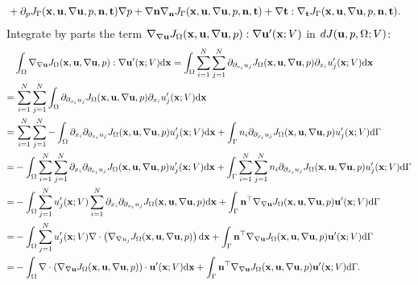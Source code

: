 \documentclass[oneside,11pt]{book}
\numberwithin{equation}{section}
\begin{document}
\begin{enumerate}[leftmargin=0in]
\begin{align*}
        &+ \partial_pJ_\Gamma({\bf x},{\bf u},\nabla{\bf u},p,{\bf n},{\bf t})\nabla p + \nabla{\bf n}\nabla_{\bf n}J_\Gamma({\bf x},{\bf u},\nabla{\bf u},p,{\bf n},{\bf t}) + \nabla{\bf t}:\nabla_{\bf t}J_\Gamma({\bf x},{\bf u},\nabla{\bf u},p,{\bf n},{\bf t}).
    \end{align*}
    Integrate by parts the term $\nabla_{\nabla{\bf u}}J_\Omega({\bf x},{\bf u},\nabla{\bf u},p):\nabla{\bf u}'({\bf x};V)$ in $dJ({\bf u},p,\Omega;V)$:
    \begin{align*}
        &\int_\Omega \nabla_{\nabla{\bf u}}J_\Omega({\bf x},{\bf u},\nabla{\bf u},p):\nabla{\bf u}'({\bf x};V){\rm d}{\bf x} = \int_\Omega \sum_{i=1}^N\sum_{j=1}^N \partial_{\partial_{x_i}u_j}J_\Omega({\bf x},{\bf u},\nabla{\bf u},p)\partial_{x_i}u_j'({\bf x};V){\rm d}{\bf x}\\
        =&\, \sum_{i=1}^N\sum_{j=1}^N \int_\Omega \partial_{\partial_{x_i}u_j}J_\Omega({\bf x},{\bf u},\nabla{\bf u},p)\partial_{x_i}u_j'({\bf x};V){\rm d}{\bf x}\\
        =&\, \sum_{i=1}^N\sum_{j=1}^N -\int_\Omega \partial_{x_i}\partial_{\partial_{x_i}u_j}J_\Omega({\bf x},{\bf u},\nabla{\bf u},p)u_j'({\bf x};V){\rm d}{\bf x} + \int_\Gamma n_i\partial_{\partial_{x_i}u_j}J_\Omega({\bf x},{\bf u},\nabla{\bf u},p)u_j'({\bf x};V){\rm d}\Gamma\\
        =&-\int_\Omega \sum_{i=1}^N\sum_{j=1}^N \partial_{x_i}\partial_{\partial_{x_i}u_j}J_\Omega({\bf x},{\bf u},\nabla{\bf u},p)u_j'({\bf x};V){\rm d}{\bf x} + \int_\Gamma \sum_{i=1}^N\sum_{j=1}^N n_i\partial_{\partial_{x_i}u_j}J_\Omega({\bf x},{\bf u},\nabla{\bf u},p)u_j'({\bf x};V){\rm d}\Gamma\\
        =&-\int_\Omega \sum_{j=1}^N u_j'({\bf x};V)\sum_{i=1}^N \partial_{x_i}\partial_{\partial_{x_i}u_j}J_\Omega({\bf x},{\bf u},\nabla{\bf u},p){\rm d}{\bf x} + \int_\Gamma {\bf n}^\top\nabla_{\nabla{\bf u}}J_\Omega({\bf x},{\bf u},\nabla{\bf u},p){\bf u}'({\bf x};V){\rm d}\Gamma\\
        =&-\int_\Omega \sum_{j=1}^N u_j'({\bf x};V)\nabla\cdot\left(\nabla_{\nabla u_j}J_\Omega({\bf x},{\bf u},\nabla{\bf u},p)\right){\rm d}{\bf x} + \int_\Gamma {\bf n}^\top\nabla_{\nabla{\bf u}}J_\Omega({\bf x},{\bf u},\nabla{\bf u},p){\bf u}'({\bf x};V){\rm d}\Gamma\\
        =&-\int_\Omega \nabla\cdot\left(\nabla_{\nabla{\bf u}}J_\Omega({\bf x},{\bf u},\nabla{\bf u},p)\right)\cdot{\bf u}'({\bf x};V){\rm d}{\bf x} + \int_\Gamma
        {\bf n}^\top\nabla_{\nabla{\bf u}}J_\Omega({\bf x},{\bf u},\nabla{\bf u},p){\bf u}'({\bf x};V){\rm d}\Gamma.

\end{align*}
\end{enumerate}
\end{document}
